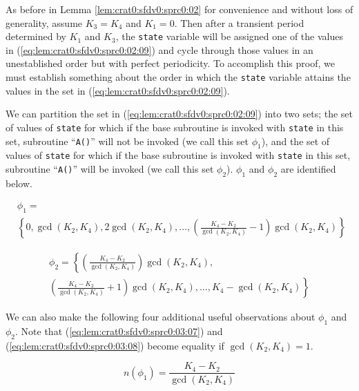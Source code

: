 \begin{vworklemmaproof}
As before in Lemma \ref{lem:crat0:sfdv0:sprc0:02} 
for convenience and without
loss of generality, assume $K_3=K_4$ and 
$K_1=0$.  Then after a transient period
determined by $K_1$ and $K_3$, the \texttt{state} 
variable will be assigned one of the values in 
(\ref{eq:lem:crat0:sfdv0:sprc0:02:09}) and cycle through
those values in an unestablished order but with perfect
periodicity.  To accomplish this proof, we must establish
something about the order in which the \texttt{state} variable attains
the values in the set in (\ref{eq:lem:crat0:sfdv0:sprc0:02:09}).

We can partition the set in (\ref{eq:lem:crat0:sfdv0:sprc0:02:09})
into two sets; the set of values of \texttt{state} for which if the 
base subroutine is invoked with \texttt{state} in this set, subroutine
``\texttt{A()}'' will not be invoked (we call this set $\phi_1$),
and the set of values of \texttt{state} for which if the 
base subroutine is invoked with \texttt{state} in this set, subroutine
``\texttt{A()}'' will be invoked (we call this set $\phi_2$).
$\phi_1$ and $\phi_2$ are identified below.

\begin{eqnarray}
\label{eq:lem:crat0:sfdv0:sprc0:03:03}
& \phi_1 = & \\
\nonumber & 
\displaystyle{\left\{
0, \gcd(K_2, K_4), 2 \gcd(K_2, K_4), \ldots , 
\left(\frac{K_4-K_2}{\gcd(K_2,K_4)} - 1 \right) \gcd(K_2, K_4) 
\right\}} &
\end{eqnarray}

\begin{eqnarray}
\label{eq:lem:crat0:sfdv0:sprc0:03:04}
& \displaystyle{
   \phi_2 = \left\{\left(\frac{K_4-K_2}{\gcd(K_2,K_4)}\right) \gcd(K_2, K_4),\right.} & \\
\nonumber & \displaystyle{\left.
\left(\frac{K_4-K_2}{\gcd(K_2,K_4)} + 1 \right) \gcd(K_2, K_4) ,
\ldots ,
K_4 - \gcd(K_2, K_4)
\right\}} &
\end{eqnarray}

We can also make the following four additional useful observations
about $\phi_1$ and $\phi_2$.  Note that
(\ref{eq:lem:crat0:sfdv0:sprc0:03:07}) and
(\ref{eq:lem:crat0:sfdv0:sprc0:03:08}) become equality
if $\gcd(K_2, K_4) = 1$.

\begin{equation}
\label{eq:lem:crat0:sfdv0:sprc0:03:05}
n(\phi_1) = \frac{K_4 - K_2}{\gcd(K_2, K_4)}
\end{equation}


\end{vworklemmaproof}
